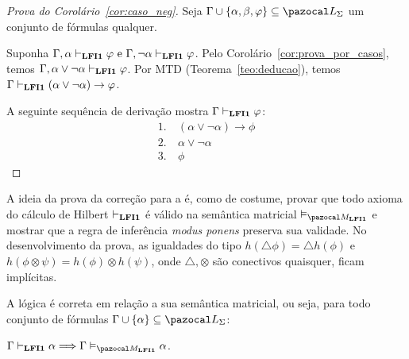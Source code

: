     \begin{proof}[Prova do Corolário~\ref{cor:caso_neg}]
        Seja $\Gamma \cup \{\alpha, \beta, \phi\} \subseteq \ling{}$ um conjunto de fórmulas qualquer.

        Suponha $\Gamma, \alpha \vdash_{{\normalfont\textbf{LFI1}}{}} \varphi \text{ e }\Gamma, \neg\alpha \vdash_{{\normalfont\textbf{LFI1}}{}} \varphi$. Pelo Corolário~\ref{cor:prova_por_casos}, temos $\Gamma, \alpha \lor \neg \alpha \vdash_{{\normalfont\textbf{LFI1}}{}} \varphi$. Por MTD (Teorema~\ref{teo:deducao}), temos $\Gamma \vdash_{{\normalfont\textbf{LFI1}}{}} (\alpha \lor \neg \alpha) \to \varphi$.

        A seguinte sequência de derivação mostra $\Gamma\vdash_{{\normalfont\textbf{LFI1}}{}} \varphi$:
        \begin{align*}
            1. ~& (\alpha \lor \neg \alpha) \to \phi\tag{MTD aplicado à suposição} \\
            2. ~& \alpha \lor \neg \alpha \tag{Ax10} \\
            3. ~& \phi \tag{MP 1,2}
        \end{align*}
    \end{proof}

    A ideia da prova da correção para a \lfium{} é, como de costume, provar que todo axioma do cálculo de Hilbert $\vdash_{{\normalfont\textbf{LFI1}}{}}$ é válido na semântica matricial $\conmat$ e mostrar que a regra de inferência \textit{modus ponens} preserva sua validade. No desenvolvimento da prova, as igualdades do tipo $h(\triangle \phi) = \triangle h(\phi)$ e $h(\phi \otimes \psi) = h(\phi) \otimes h(\psi)$, onde $\triangle, \otimes$ são conectivos quaisquer, ficam implícitas.


    \begin{teorema}\label{teo:correcao_mat}
        A lógica {\normalfont\lfium{}} é correta em relação a sua semântica matricial, ou seja, para todo conjunto de fórmulas $\Gamma \cup \{\alpha\} \subseteq \ling{}$:

        \centering
        {\normalfont{} $\Gamma \conhil \alpha \Longrightarrow \Gamma \conmat \alpha$.}
    \end{teorema}


